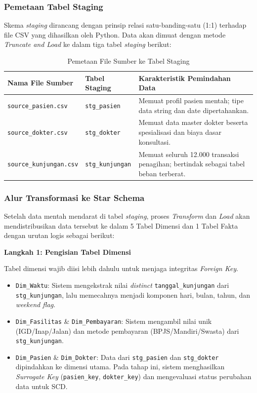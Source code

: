 \subsubsection{Pemetaan Tabel Staging}
 
Skema \textit{staging} dirancang dengan prinsip relasi satu-banding-satu (1:1) terhadap file CSV yang dihasilkan oleh Python. Data akan dimuat dengan metode \textit{Truncate and Load} ke dalam tiga tabel \textit{staging} berikut:
 
\begin{table}[H]
\centering
\caption{Pemetaan File Sumber ke Tabel Staging}
\begin{tabularx}{\linewidth}{p{4cm}p{3cm}X}
\toprule
\textbf{Nama File Sumber} & \textbf{Tabel Staging} & \textbf{Karakteristik Pemindahan Data} \\
\midrule
\texttt{source\_pasien.csv}    & \texttt{stg\_pasien}    & Memuat profil pasien mentah; tipe data string dan date dipertahankan. \\
\texttt{source\_dokter.csv}    & \texttt{stg\_dokter}    & Memuat data master dokter beserta spesialisasi dan biaya dasar konsultasi. \\
\texttt{source\_kunjungan.csv} & \texttt{stg\_kunjungan} & Memuat seluruh 12.000 transaksi penagihan; bertindak sebagai tabel beban terberat. \\
\bottomrule
\end{tabularx}
\end{table}
 
\subsubsection{Alur Transformasi ke Star Schema}
 
Setelah data mentah mendarat di tabel \textit{staging}, proses \textit{Transform} dan \textit{Load} akan mendistribusikan data tersebut ke dalam 5 Tabel Dimensi dan 1 Tabel Fakta dengan urutan logis sebagai berikut:
 
\textbf{Langkah 1: Pengisian Tabel Dimensi}
 
Tabel dimensi wajib diisi lebih dahulu untuk menjaga integritas \textit{Foreign Key}.
 
\begin{itemize}
    \item \texttt{Dim\_Waktu}: Sistem mengekstrak nilai \textit{distinct} \texttt{tanggal\_kunjungan} dari \texttt{stg\_kunjungan}, lalu memecahnya menjadi komponen hari, bulan, tahun, dan \textit{weekend flag}.
    \item \texttt{Dim\_Fasilitas} \& \texttt{Dim\_Pembayaran}: Sistem mengambil nilai unik (IGD/Inap/Jalan) dan metode pembayaran (BPJS/Mandiri/Swasta) dari \texttt{stg\_kunjungan}.
    \item \texttt{Dim\_Pasien} \& \texttt{Dim\_Dokter}: Data dari \texttt{stg\_pasien} dan \texttt{stg\_dokter} dipindahkan ke dimensi utama. Pada tahap ini, sistem menghasilkan \textit{Surrogate Key} (\texttt{pasien\_key}, \texttt{dokter\_key}) dan mengevaluasi status perubahan data untuk SCD.
\end{itemize}
 
